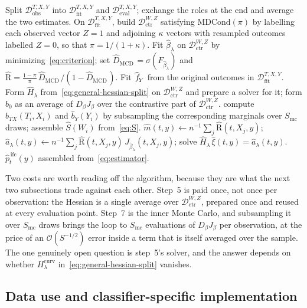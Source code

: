 \documentclass[11pt]{article}
\theoremstyle{plain}
\theoremstyle{definition}
\theoremstyle{remark}
\newcommand{\mcd}{\text{MCD}\,}
\newcommand{\MDC}{\ensuremath{\text{MDCond}}}
\newcommand{\pfhat}[1]{\ensuremath{\,\mathlarger{\widehat{\textit{f}}}_{#1}}}
\newcommand{\ratio}{\ensuremath{\pi}}
\newcommand{\contrasthat}{\widehat{D}_{\mcd}}
\newcommand{\DensityRatio}{\text{R}}
\newcommand{\Dobs}{\ensuremath{\mathcal{D}_{\mathrm{obs}}^{T,X,Y}}}
\newcommand{\Dfit}{\ensuremath{\mathcal{D}_{\mathrm{fit}}^{T,X,Y}}}
\newcommand{\Deval}{\ensuremath{\mathcal{D}_{\mathrm{eval}}^{T,X,Y}}}
\newcommand{\Dctr}{\ensuremath{\mathcal{D}_{\mathrm{ctr}}^{W,Z}}}
\newcommand{\betahat}{\widehat{\beta}}
\newcommand{\cO}{\mathcal{O}}
\newcommand{\score}{S}
\begin{document}
\begin{algorithm}[htbp]
\caption{The IF-corrected estimator (any differentiable discriminant)}
\label{alg:generic}
\begin{algorithmic}[1]
\State Split $\Dobs$ into $\Dfit$ and $\Deval$; exchange the roles at the end and average the two estimates.
\State On $\Dfit$, build $\Dctr$ satisfying $\MDC(\ratio)$ by labelling each observed vector $Z=1$ and adjoining $\kappa$ vectors with resampled outcomes labelled $Z=0$, so that $\ratio=1/(1+\kappa)$.
\State Fit $\betahat_\lambda$ on $\Dctr$ by minimizing~\eqref{eq:criterion}; set $\contrasthat=\sigma(F_{\betahat_\lambda})$ and $\widehat{\DensityRatio}=\tfrac{1-\ratio}{\ratio}\,\contrasthat/(1-\contrasthat)$.
\State Fit $\pfhat{Y}$ from the original outcomes in $\Dfit$.
\State Form $\widehat H_\lambda$ from~\eqref{eq:general-hessian-split} on $\Dctr$ and prepare a solver for it; form $\widehat b_0$ as an average of $D_\beta J_\beta$ over the contrastive part of $\Dctr$.
\For{each $W_i$ in $\Deval$}
  \State compute $\widehat b_{TX}(T_i,X_i)$ and $\widehat b_Y(Y_i)$ by subsampling the corresponding marginals over $S_{\mathrm{mc}}$ draws;
  \State assemble $\widehat\score(W_i)$ from~\eqref{eq:S}.
\EndFor
{}
  \State $\widehat m(t,y)\gets n^{-1}\sum_j\widehat{\DensityRatio}(t,X_j,y)$;
  \State $\widehat a_\lambda(t,y)\gets n^{-1}\sum_j \widehat{\DensityRatio}(t,X_j,y)\,J_{\betahat_\lambda}(t,X_j,y)$; solve $\widehat H_\lambda\,\widehat\xi(t,y)=\widehat a_\lambda(t,y)$.
\EndFor
\State \Return $\widehat p^{\,\mathrm{ifc}}_t(y)$ assembled from~\eqref{eq:estimator}.
\end{algorithmic}
\end{algorithm}

Two costs are worth reading off the algorithm, because they are what the next two subsections
trade against each other. Step~5 is paid once, not once per observation: the Hessian is a
single average over $\Dctr$, prepared once and reused at every evaluation point. Step~7 is the
inner Monte Carlo, and subsampling it over $S_{\mathrm{mc}}$ draws brings the loop to $S_{\mathrm{mc}}$ evaluations of
$D_\beta J_\beta$ per observation, at the price of an $\cO(S^{-1/2})$ error inside a term that
is itself averaged over the sample. The
one genuinely open question is step~5's solver, and the answer depends on whether
$H_\lambda^{\mathrm{curv}}$ in~\eqref{eq:general-hessian-split} vanishes.
\iffalse
\subsection{Data use and classifier-specific implementation}
\label{sec:classifier-pipelines}
\end{document}
